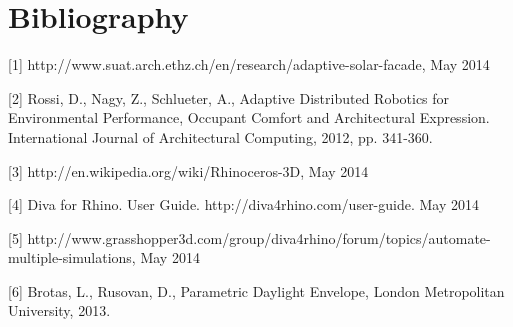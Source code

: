 \chapter*{Bibliography}

[1] http://www.suat.arch.ethz.ch/en/research/adaptive-solar-facade, May 2014

[2] Rossi, D., Nagy, Z., Schlueter, A., Adaptive Distributed Robotics for Environmental Performance, Occupant Comfort and Architectural Expression. International Journal of Architectural Computing, 2012, pp. 341-360.

[3] http://en.wikipedia.org/wiki/Rhinoceros-3D, May 2014

[4] Diva for Rhino. User Guide. http://diva4rhino.com/user-guide. May 2014

[5] http://www.grasshopper3d.com/group/diva4rhino/forum/topics/automate-multiple-simulations, May 2014

[6] Brotas, L., Rusovan, D., Parametric Daylight Envelope, London Metropolitan University, 2013.